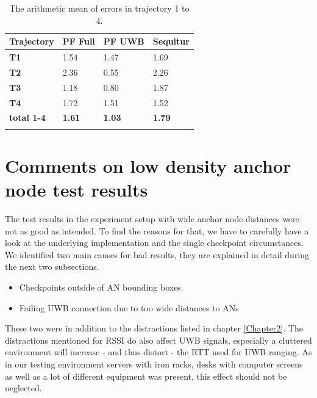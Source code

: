 \begin{table}
\caption{The arithmetic mean of errors in trajectory 1 to 4.}
\label{tab:arithmetic_errors}
\centering
\begin{tabular}{l l l l}
\toprule
\textbf{Trajectory} & \textbf{PF Full} & \textbf{PF UWB} & \textbf{Sequitur}\\
\midrule
\textbf{T1} & 1.54 & 1.47 & 1.69\\
\textbf{T2} & 2.36 & 0.55 & 2.26\\
\textbf{T3} & 1.18 & 0.80 & 1.87\\
\textbf{T4} & 1.72 & 1.51 & 1.52\\
\midrule
\textbf{total 1-4}  & \textbf{1.61} & \textbf{1.03} & \textbf{1.79}\\
\bottomrule\\
\end{tabular}
\end{table}


\section{Comments on low density anchor node test results}
\label{Section2}
The test results in the experiment setup with wide anchor node distances were not as good as intended. To find the reasons for that, we have to carefully have a look at the underlying implementation and the single checkpoint circumstances. We identified two main causes for bad results, they are explained in detail during the next two subsections.
\begin{itemize}
\item Checkpoints outside of AN bounding boxes
\item Failing UWB connection due to too wide distances to ANs
\end{itemize}
These two were in addition to the distractions listed in chapter \ref{Chapter2}. The distractions mentioned for RSSI do also affect UWB signals, especially a cluttered environment will increase - and thus distort - the RTT used for UWB ranging. As in our testing environment servers with iron racks, desks with computer screens as well as a lot of different equipment was present, this effect should not be neglected.

